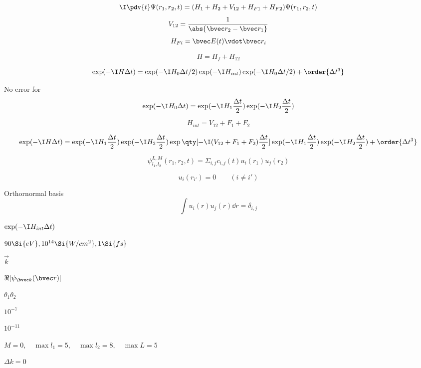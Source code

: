 
\begin{equation}
\I \pdv{t}\Psi(r_1, r_2, t) = (H_1 + H_2 + V_{12} + H_{F1} + H_{F2})\Psi(r_1, r_2, t)
\end{equation}
\begin{equation}
V_{12} = \frac{1}{\abs{\bvec r_2 - \bvec r_1}}
\end{equation}
\begin{equation}
H_{Fi} = \bvec E(t) \vdot \bvec r_i
\end{equation}


\begin{equation}
H = H_f + H_{12}
\end{equation}

\begin{equation}
\exp(-\I H \Delta t) = \exp(-\I H_0 \Delta t/2) \exp(-\I H_{int}) \exp(-\I H_0 \Delta t/2) + \order{\Delta t^3}
\end{equation}

No error for
\begin{equation}
\exp(-\I H_0 \Delta t) = \exp(-\I H_{1} \frac{\Delta t}{2}) \exp(-\I H_2 \frac{\Delta t}{2})
\end{equation}

\begin{equation}
H_{int} = V_{12} + F_1 + F_2
\end{equation}

\begin{equation}
\exp(-\I H\Delta t) = \exp(-\I H_{1} \frac{\Delta t}{2}) \exp(-\I H_2 \frac{\Delta t}{2}) \exp\qty[-\I (V_{12} + F_1 + F_2) \frac{\Delta t}{2}] \exp(-\I H_{1} \frac{\Delta t}{2}) \exp(-\I H_{2} \frac{\Delta t}{2}) + \order{\Delta t^3}
\end{equation}

\begin{equation}
\psi_{l_1,l_2}^{L,M}(r_1, r_2, t) = \Sigma_{i,j} c_{i,j}(t) u_i(r_1) u_j(r_2)
\end{equation}

\begin{equation}
u_i(r_{i'}) = 0 \qquad (i \ne i')
\end{equation}

Orthornormal basis
\begin{equation}
\int u_i(r)u_j(r) \dd{r} = \delta_{i,j}
\end{equation}

$\exp(-\I H_{int}\Delta t)$

$90\Si{eV}, 10^{14} \Si{W/cm^2}, 1\Si{fs}$

$\vec k$

$\Re [\psi_{\bvec k}(\bvec r)]$

$\theta_1 \theta_2$

$10^{-7}$

$10^{-11}$

$M = 0, \quad\max{l_1} = 5, \quad\max{l_2} = 8, \quad\max{L} = 5$

$\Delta k = 0$
